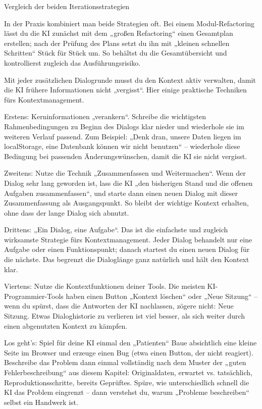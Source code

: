 \begin{center}\small\color{gray}Vergleich der beiden Iterationsstrategien\end{center}

In der Praxis kombiniert man beide Strategien oft. Bei einem Modul-Refactoring lässt du die KI zunächst mit dem „großen Refactoring“ einen Gesamtplan erstellen; nach der Prüfung des Plans setzt du ihn mit „kleinen schnellen Schritten“ Stück für Stück um. So behältst du die Gesamtübersicht und kontrollierst zugleich das Ausführungsrisiko.


Mit jeder zusätzlichen Dialogrunde musst du den Kontext aktiv verwalten, damit die KI frühere Informationen nicht „vergisst“. Hier einige praktische Techniken fürs Kontextmanagement.

Erstens: Kerninformationen „verankern“. Schreibe die wichtigsten Rahmenbedingungen zu Beginn des Dialogs klar nieder und wiederhole sie im weiteren Verlauf passend. Zum Beispiel: „Denk dran, unsere Daten liegen im localStorage, eine Datenbank können wir nicht benutzen“ – wiederhole diese Bedingung bei passenden Änderungswünschen, damit die KI sie nicht vergisst.

Zweitens: Nutze die Technik „Zusammenfassen und Weitermachen“. Wenn der Dialog sehr lang geworden ist, lass die KI „den bisherigen Stand und die offenen Aufgaben zusammenfassen“, und starte dann einen neuen Dialog mit dieser Zusammenfassung als Ausgangspunkt. So bleibt der wichtige Kontext erhalten, ohne dass der lange Dialog sich abnutzt.

Drittens: „Ein Dialog, eine Aufgabe“. Das ist die einfachste und zugleich wirksamste Strategie fürs Kontextmanagement. Jeder Dialog behandelt nur eine Aufgabe oder einen Funktionspunkt; danach startest du einen neuen Dialog für die nächste. Das begrenzt die Dialoglänge ganz natürlich und hält den Kontext klar.

Viertens: Nutze die Kontextfunktionen deiner Tools. Die meisten KI-Programmier-Tools haben einen Button „Kontext löschen“ oder „Neue Sitzung“ – wenn du spürst, dass die Antworten der KI nachlassen, zögere nicht: Neue Sitzung. Etwas Dialoghistorie zu verlieren ist viel besser, als sich weiter durch einen abgenutzten Kontext zu kämpfen.

\begin{tcbpractice}{Los geht's: Spiel für deine KI einmal den „Patienten“}
Baue absichtlich eine kleine Seite im Browser und erzeuge einen Bug (etwa einen Button, der nicht reagiert). Beschreibe das Problem dann einmal vollständig nach dem Muster der „guten Fehlerbeschreibung“ aus diesem Kapitel: Originaldaten, erwartet vs. tatsächlich, Reproduktionsschritte, bereits Geprüftes. Spüre, wie unterschiedlich schnell die KI das Problem eingrenzt – dann verstehst du, warum „Probleme beschreiben“ selbst ein Handwerk ist.

\end{tcbpractice}

